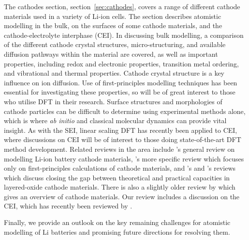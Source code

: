 \documentclass[../main.tex]{subfiles}
\begin{document}
The cathodes section, section~\ref{sec:cathodes}, covers a range of different cathode materials used in a variety of Li-ion cells. The section describes atomistic modelling in the bulk, on the surfaces of some cathode materials, and the cathode-electrolyte interphase (CEI). In discussing bulk modelling, a comparison of the different cathode crystal structures, micro-structuring, and available diffusion pathways within the material are covered, as well as important properties, including redox and electronic properties, transition metal ordering, and vibrational and thermal properties. Cathode crystal structure is a key influence on ion diffusion. Use of first-principles modelling techniques has been essential for investigating these properties, so will be of great interest to those who utilise DFT in their research. Surface structures and morphologies of cathode particles can be difficult to determine using experimental methods alone, which is where \textit{ab initio} and classical molecular dynamics can provide vital insight. As with the SEI, linear scaling DFT has recently been applied to CEI, where discussions on CEI will be of interest to those doing state-of-the-art DFT method development. Related reviews in the area include \citeauthor{ma2018computer}'s \cite{ma2018computer} general review on modelling Li-ion battery cathode materials, \citeauthor{yan2014review}'s \cite{yan2014review} more specific review which focuses only on first-principles calculations of cathode materials, and \citeauthor{radin2017narrowing}'s \cite{radin2017narrowing} and \citeauthor{wang2018reviving}'s \cite{wang2018reviving} reviews which discuss closing the gap between theoretical and practical capacities in layered-oxide cathode materials. There is also a slightly older review by \citeauthor{daniel2014cathode} \cite{daniel2014cathode} which gives an overview of cathode materials. Our review includes a discussion on the CEI, which has recently been reviewed by \citeauthor{maleki2019controllable} \cite{maleki2019controllable}.

Finally, we provide an outlook on the key remaining challenges for atomistic modelling of Li batteries and promising future directions for resolving them.
\end{document}
